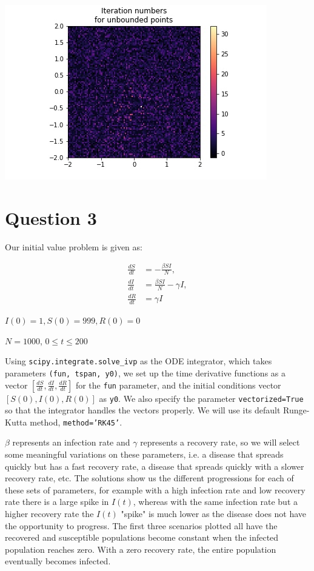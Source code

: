 \documentclass{article}
\begin{document}
\includegraphics[scale=0.7]{plot2_2}

\section*{Question 3}

Our initial value problem is given as:

\begin{align}
    \frac{dS}{dt} &= -\frac{\beta S I}{N},\\
    \frac{dI}{dt} &= \frac{\beta S I}{N} - \gamma I,\\
    \frac{dR}{dt} &= \gamma I
\end{align}

$I(0) = 1, S(0)=999, R(0) = 0$

$N=1000$, $0\leq t \leq 200$

Using \texttt{scipy.integrate.solve\_ivp} as the ODE integrator, which takes parameters \texttt{(fun, tspan, y0)}, we set up the time derivative functions as a vector $[\frac{dS}{dt},\frac{dI}{dt},\frac{dR}{dt}]$ for the \texttt{fun} parameter, and the initial conditions vector $[S(0), I(0), R(0)]$ as \texttt{y0}. We also specify the parameter \texttt{vectorized=True} so that the integrator handles the vectors properly. We will use its default Runge-Kutta method, \texttt{method='RK45'}.

$\beta$ represents an infection rate and $\gamma$ represents a recovery rate, so we will select some meaningful variations on these parameters, i.e. a disease that spreads quickly but has a fast recovery rate, a disease that spreads quickly with a slower recovery rate, etc. The solutions show us the different progressions for each of these sets of parameters, for example with a high infection rate and low recovery rate there is a large spike in $I(t)$, whereas with the same infection rate but a higher recovery rate the $I(t)$ "spike" is much lower as the disease does not have the opportunity to progress. The first three scenarios plotted all have the recovered and susceptible populations become constant when the infected population reaches zero. With a zero recovery rate, the entire population eventually becomes infected.
\end{document}
